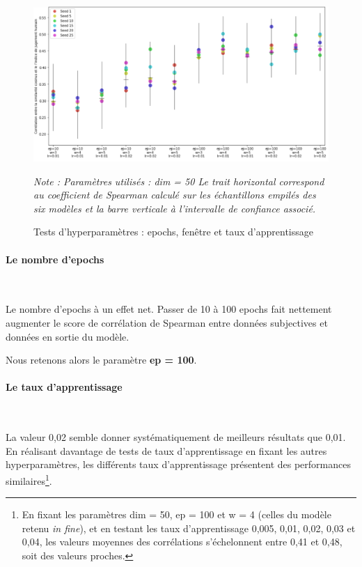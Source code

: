 \documentclass[11pt,french,french]{article}
\let\rmarkdownfootnote\footnote%
\def\footnote{\protect\rmarkdownfootnote}
\begin{document}
\begin{figure}
\begin{center}
\includegraphics[width=1\textwidth]{img/test_parametres.png}
\captionsetup{margin=0cm,format=hang,justification=justified}
\caption{Tests d'hyperparamètres : epochs, fenêtre et taux d'apprentissage}\label{fig:evaluation_1}
\end{center}
\vspace{-0.3cm}
\footnotesize
\emph{Note : Paramètres utilisés : dim = 50\newline
Le trait horizontal correspond au coefficient de Spearman calculé sur les échantillons empilés des six modèles et la barre verticale à l'intervalle de confiance associé.}
\end{figure}

\paragraph{Le nombre d'epochs}\label{le-nombre-depochs}

~

Le nombre d'epochs à un effet net. Passer de 10 à 100 epochs fait
nettement augmenter le score de corrélation de Spearman entre données
subjectives et données en sortie du modèle.

\faArrowCircleRight{} Nous retenons alors le paramètre \textbf{ep =
100}.

\paragraph{Le taux d'apprentissage}\label{le-taux-dapprentissage}

~

La valeur 0,02 semble donner systématiquement de meilleurs résultats que
0,01. En réalisant davantage de tests de taux d'apprentissage en fixant
les autres hyperparamètres, les différents taux d'apprentissage
présentent des performances similaires\footnote{En fixant les paramètres
  dim = 50, ep = 100 et w = 4 (celles du modèle retenu \emph{in fine}),
  et en testant les taux d'apprentissage 0,005, 0,01, 0,02, 0,03 et
  0,04, les valeurs moyennes des corrélations s'échelonnent entre 0,41
  et 0,48, soit des valeurs proches.}.
\end{document}
